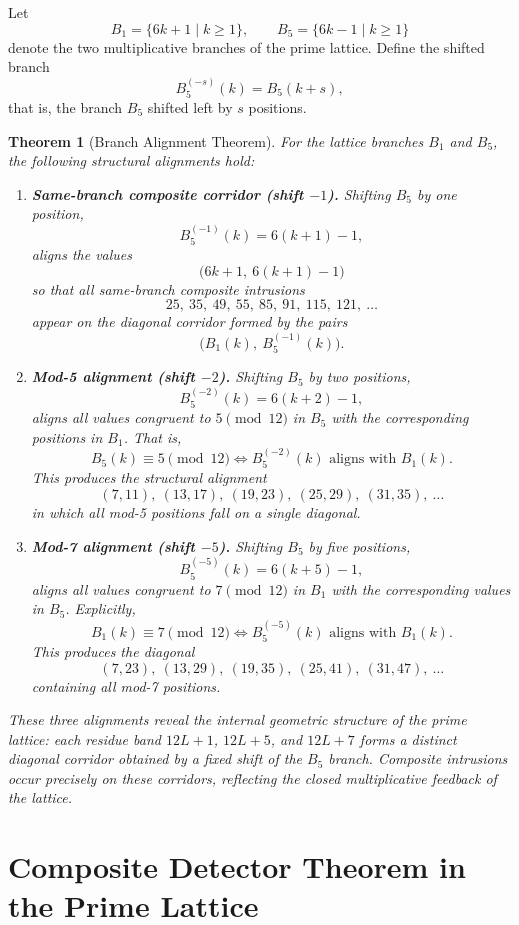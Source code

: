 \documentclass[12pt]{article}
\newtheorem{theorem}{Theorem}
\begin{document}
Let
\[
B_1 = \{6k+1 \mid k \geq 1\}, \qquad B_5 = \{6k-1 \mid k \geq 1\}
\]
denote the two multiplicative branches of the prime lattice. Define the
shifted branch
\[
B_5^{(-s)}(k) = B_5(k+s),
\]
that is, the branch $B_5$ shifted left by $s$ positions.

\begin{theorem}[Branch Alignment Theorem]
For the lattice branches $B_1$ and $B_5$, the following structural
alignments hold:

\begin{enumerate}
\item \textbf{Same-branch composite corridor (shift $-1$).}
Shifting $B_5$ by one position,
\[
B_5^{(-1)}(k) = 6(k+1) - 1,
\]
aligns the values
\[
\bigl(6k+1,\ 6(k+1)-1\bigr)
\]
so that all same-branch composite intrusions
\[
25,\ 35,\ 49,\ 55,\ 85,\ 91,\ 115,\ 121,\ \ldots
\]
appear on the diagonal corridor formed by the pairs
\[
\bigl(B_1(k),\ B_5^{(-1)}(k)\bigr).
\]

\item \textbf{Mod-5 alignment (shift $-2$).}
Shifting $B_5$ by two positions,
\[
B_5^{(-2)}(k) = 6(k+2) - 1,
\]
aligns all values congruent to $5 \pmod{12}$ in $B_5$ with the corresponding
positions in $B_1$. That is,
\[
B_5(k) \equiv 5 \pmod{12} \iff B_5^{(-2)}(k) \text{ aligns with } B_1(k).
\]
This produces the structural alignment
\[
(7,11),\ (13,17),\ (19,23),\ (25,29),\ (31,35),\ \ldots
\]
in which all mod-5 positions fall on a single diagonal.

\item \textbf{Mod-7 alignment (shift $-5$).}
Shifting $B_5$ by five positions,
\[
B_5^{(-5)}(k) = 6(k+5) - 1,
\]
aligns all values congruent to $7 \pmod{12}$ in $B_1$ with the corresponding
values in $B_5$. Explicitly,
\[
B_1(k) \equiv 7 \pmod{12} \iff B_5^{(-5)}(k) \text{ aligns with } B_1(k).
\]
This produces the diagonal
\[
(7,23),\ (13,29),\ (19,35),\ (25,41),\ (31,47),\ \ldots
\]
containing all mod-7 positions.
\end{enumerate}

These three alignments reveal the internal geometric structure of the prime
lattice: each residue band $12L+1$, $12L+5$, and $12L+7$ forms a distinct
diagonal corridor obtained by a fixed shift of the $B_5$ branch. Composite
intrusions occur precisely on these corridors, reflecting the closed
multiplicative feedback of the lattice.
\end{theorem}


\section{Composite Detector Theorem in the Prime Lattice}
\end{document}
